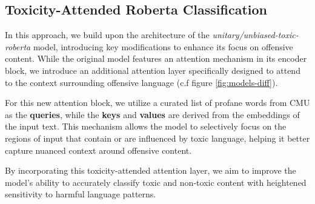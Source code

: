 \subsection{Toxicity-Attended Roberta Classification}
In this approach, we build upon the architecture of the \textit{unitary/unbiased-toxic-roberta} model, introducing key modifications to enhance its focus on offensive content. While the original model features an attention mechanism in its encoder block, we introduce an additional attention layer specifically designed to attend to the context surrounding offensive language (c.f figure \ref{fig:models-diff}).

For this new attention block, we utilize a curated list of profane words from CMU as the \textbf{queries}, while the \textbf{keys} and \textbf{values} are derived from the embeddings of the input text. This mechanism allows the model to selectively focus on the regions of input that contain or are influenced by toxic language, helping it better capture nuanced context around offensive content.

By incorporating this toxicity-attended attention layer, we aim to improve the model's ability to accurately classify toxic and non-toxic content with heightened sensitivity to harmful language patterns.

